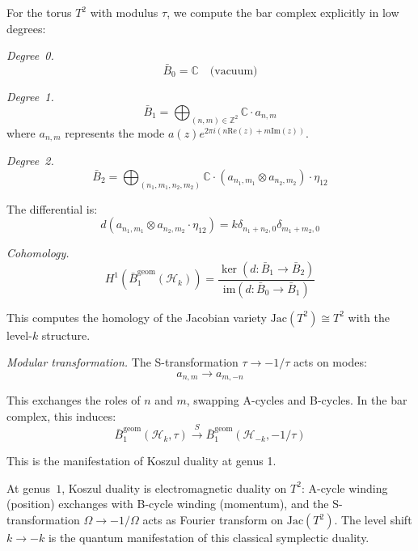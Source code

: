 \begin{example}\label{ex:heisenberg-genus1-explicit}
For the torus $T^2$ with modulus $\tau$, we compute the bar complex explicitly in low degrees:

\emph{Degree~0.}
\[\bar{B}_0 = \mathbb{C} \quad \text{(vacuum)}\]

\emph{Degree~1.}
\[\bar{B}_1 = \bigoplus_{(n,m) \in \mathbb{Z}^2} \mathbb{C} \cdot a_{n,m}\]
where $a_{n,m}$ represents the mode $a(z) e^{2\pi i(n\text{Re}(z) + m\text{Im}(z))}$.

\emph{Degree~2.}
\[\bar{B}_2 = \bigoplus_{(n_1,m_1,n_2,m_2)} \mathbb{C} \cdot (a_{n_1,m_1} \otimes a_{n_2,m_2}) \cdot \eta_{12}\]

The differential is:
\[d(a_{n_1,m_1} \otimes a_{n_2,m_2} \cdot \eta_{12}) = k\delta_{n_1+n_2,0} \delta_{m_1+m_2,0}\]

\emph{Cohomology.}
\[H^1(\bar{B}^{\text{geom}}_1(\mathcal{H}_k)) = \frac{\ker(d: \bar{B}_1 \to \bar{B}_2)}{\text{im}(d: \bar{B}_0 \to \bar{B}_1)}\]

This computes the homology of the Jacobian variety $\text{Jac}(T^2) \cong T^2$ with the level-$k$ structure.

\emph{Modular transformation.} The S-transformation $\tau \to -1/\tau$ acts on modes:
\[a_{n,m} \to a_{m,-n}\]

This exchanges the roles of $n$ and $m$, swapping A-cycles and B-cycles. In the bar complex, this induces:
\[\bar{B}^{\text{geom}}_1(\mathcal{H}_k, \tau) \xrightarrow{S} \bar{B}^{\text{geom}}_1(\mathcal{H}_{-k}, -1/\tau)\]

This is the manifestation of Koszul duality at genus 1.
\end{example}

\begin{remark}\label{rem:heisenberg-physics}
At genus~$1$, Koszul duality is electromagnetic duality on $T^2$: A-cycle winding (position) exchanges with B-cycle winding (momentum), and the S-transformation $\Omega \to -1/\Omega$ acts as Fourier transform on $\mathrm{Jac}(T^2)$.  The level shift $k \to -k$ is the quantum manifestation of this classical symplectic duality.
\end{remark}

